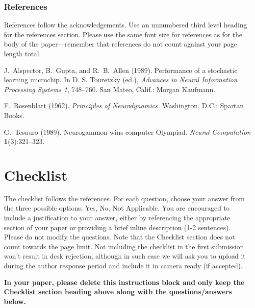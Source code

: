 \documentclass[twoside]{article}
\begin{document}
\subsubsection*{References}

References follow the acknowledgements. Use an unnumbered third level
heading for the references section.  Please use the same font
size for references as for the body of the paper---remember that
references do not count against your page length total.

\begin{thebibliography}{}
\setlength{\itemindent}{-\leftmargin}
\makeatletter\renewcommand{\@biblabel}[1]{}\makeatother
\bibitem{} J.~Alspector, B.~Gupta, and R.~B.~Allen (1989).
    \newblock Performance of a stochastic learning microchip.
    \newblock In D. S. Touretzky (ed.),
    \textit{Advances in Neural Information Processing Systems 1}, 748--760.
    San Mateo, Calif.: Morgan Kaufmann.

\bibitem{} F.~Rosenblatt (1962).
    \newblock \textit{Principles of Neurodynamics.}
    \newblock Washington, D.C.: Spartan Books.

\bibitem{} G.~Tesauro (1989).
    \newblock Neurogammon wins computer Olympiad.
    \newblock \textit{Neural Computation} \textbf{1}(3):321--323.
\end{thebibliography}

\section*{Checklist}


The checklist follows the references. For each question, choose your answer from the three possible options: Yes, No, Not Applicable.  You are encouraged to include a justification to your answer, either by referencing the appropriate section of your paper or providing a brief inline description (1-2 sentences). 
Please do not modify the questions.  Note that the Checklist section does not count towards the page limit. Not including the checklist in the first submission won't result in desk rejection, although in such case we will ask you to upload it during the author response period and include it in camera ready (if accepted).

\textbf{In your paper, please delete this instructions block and only keep the Checklist section heading above along with the questions/answers below.}
\end{document}
